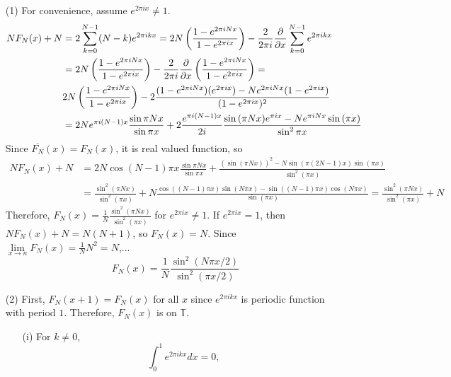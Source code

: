 \documentclass{article}
\begin{document}
\begin{enumerate}
\item[(1)] For convenience, assume $e^{2\pi i x}\neq 1$.
\begin{equation*}
\begin{split}
NF_N(x)+N&=2\sum\limits_{k=0}^{N-1} (N-k)e^{2\pi i k x} = 2N\left(\frac{1-e^{2\pi i N x}}{1-e^{2\pi i x}}\right) - \frac{2}{2\pi i }\pdv{x} \sum\limits_{k=0}^{N-1}e^{2\pi i k x} \\
&=2N\left(\frac{1-e^{2\pi i N x}}{1-e^{2\pi i x}}\right)- \frac{2}{2\pi i }\pdv{x}\left(\frac{1-e^{2\pi i N x}}{1-e^{2\pi i x}}\right) = \\
&2N\left(\frac{1-e^{2\pi i N x}}{1-e^{2\pi i x}}\right) - 2\frac{(1-e^{2\pi i N x})(e^{2\pi i x}) - Ne^{2\pi i N x}(1-e^{2\pi i x})}{(1-e^{2\pi i x})^2} \\
&=2Ne^{\pi i (N-1)x} \frac{\sin{\pi N x}}{\sin{ \pi x}} + 2\frac{e^{\pi i (N-1)x}}{2i}\frac{\sin{(\pi N x)}e^{\pi i x}- Ne^{\pi i N x}\sin{(\pi x)}}{\sin^2{\pi x}}
\end{split}
\end{equation*}
Since $\overline{F_N}(x)=F_N(x)$, it is real valued function, so
\begin{equation*}
\begin{split}
NF_N(x)+N&=2N\cos{(N-1)\pi x}\frac{\sin{\pi N x}}{\sin{ \pi x}} + \frac{\left(\sin(\pi N x)\right)^2 -N \sin(\pi (2N-1) x)\sin(\pi x)}{\sin^2(\pi x)} \\
&=\frac{\sin^2(\pi N x)}{\sin^2(\pi x)} + N\frac{\cos((N-1)\pi x) \sin (N \pi x)- \sin((N-1)\pi x) \cos (N \pi x)}{\sin(\pi x)} = \frac{\sin^2(\pi N x)}{\sin^2(\pi x)} + N
\end{split}
\end{equation*}
Therefore, $F_N(x)=\frac{1}{N}\frac{\sin^2(\pi N x)}{\sin^2(\pi x)}$ for $e^{2\pi i x}\neq 1$. If $e^{2\pi i x}=1$, then $NF_N(x)+N=N(N+1)$, so $F_N(x)=N$. Since $\lim\limits_{x\rightarrow n}F_N(x) = \frac{1}{N}N^2=N$,...
\begin{equation*}
F_N(x)=\frac{1}{N}\frac{\sin^2(N\pi x/2)}{\sin^2{(\pi x/2)}}
\end{equation*}
\item[(2)] First, $F_N(x+1)=F_N(x)$ for all $x$ since $e^{2\pi i k x}$ is periodic function with period $1$. Therefore, $F_N(x)$ is on $\mathbb{T}$.
\begin{enumerate}
\item[(i)] For $k\neq 0$,
\begin{equation*}
\int_0^1 e^{2\pi i k x} dx=0,
\end{equation*}

\end{enumerate}
\end{enumerate}
\end{document}
